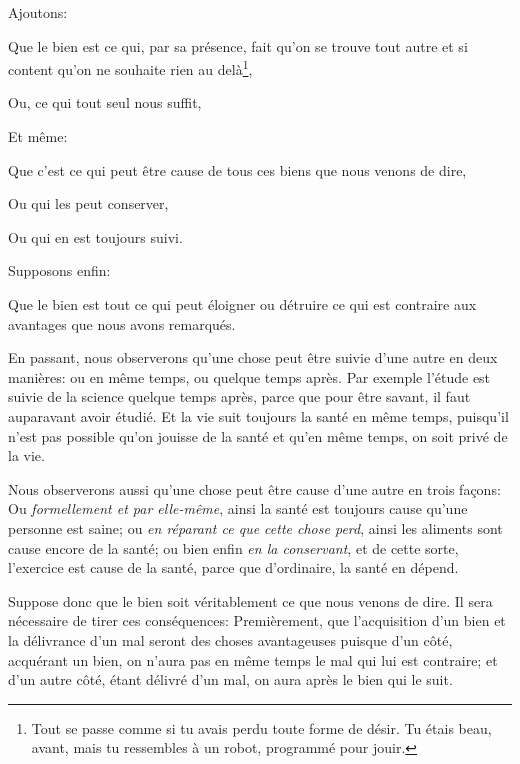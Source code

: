 Ajoutons:

\begin{emphpar}
	Que le bien est ce qui, par sa présence, fait qu'on se trouve tout autre et si content qu'on ne souhaite rien au
	delà\footnote{Tout se passe comme si tu avais perdu toute forme de désir. Tu étais beau, avant, mais tu ressembles
	à un robot, programmé pour jouir.},

	Ou, ce qui tout seul nous suffit,
\end{emphpar}

Et même:

\begin{emphpar}
	Que c'est ce qui peut être cause de tous ces biens que nous venons de dire,

	Ou qui les peut conserver,

	Ou qui en est toujours suivi.
\end{emphpar}

\bigbreak

Supposons enfin:

\begin{emphpar}
	Que le bien est tout ce qui peut éloigner ou détruire ce qui est contraire aux avantages que nous avons remarqués.
\end{emphpar}

En passant, nous observerons qu'une chose peut être suivie d'une autre en deux manières: ou en même temps, ou quelque temps
après. Par exemple l'étude est suivie de la science quelque temps après, parce que pour être savant, il faut auparavant
avoir étudié. Et la vie suit toujours la santé en même temps, puisqu'il n'est pas possible qu'on jouisse de la santé et
qu'en même temps, on soit privé de la vie.

Nous observerons aussi qu'une chose peut être cause d'une autre en trois façons: Ou \emph{formellement et par elle-même},
ainsi la santé est toujours cause qu'une personne est saine; ou \emph{en réparant ce que cette chose perd}, ainsi les
aliments sont cause encore de la santé; ou bien enfin \emph{en la conservant}, et de cette sorte, l'exercice est cause de
la santé, parce que d'ordinaire, la santé en dépend.

\bigbreak

Suppose donc que le bien soit véritablement ce que nous venons de dire. Il sera nécessaire de tirer ces conséquences:
Premièrement, que l'acquisition d'un bien et la délivrance d'un mal seront des choses avantageuses puisque d'un côté,
acquérant un bien, on n'aura pas en même temps le mal qui lui est contraire; et d'un autre côté, étant délivré d'un
mal, on aura après le bien qui le suit. 

